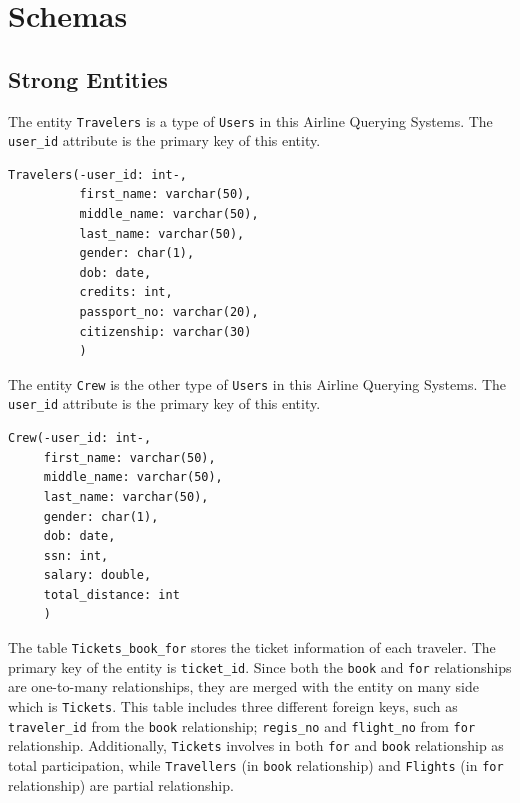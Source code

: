 \documentclass{article}
\begin{document}
	\section{Schemas}
	
	\subsection{Strong Entities}
	
	\noindent The entity \texttt{Travelers} is a type of \texttt{Users} in this Airline Querying Systems. The \texttt{user\_id} attribute is the primary key of this entity.
	\begin{lstlisting}[keepspaces=true]
Travelers(-user_id: int-,
          first_name: varchar(50),
          middle_name: varchar(50),
          last_name: varchar(50),
          gender: char(1),
          dob: date,
          credits: int,
          passport_no: varchar(20), 
          citizenship: varchar(30)
          )
	\end{lstlisting}
    
	\noindent The entity \texttt{Crew} is the other type of \texttt{Users} in this Airline Querying Systems. The \texttt{user\_id} attribute is the primary key of this entity.
	\begin{lstlisting}[keepspaces=true]
Crew(-user_id: int-,
     first_name: varchar(50),
     middle_name: varchar(50),
     last_name: varchar(50),
     gender: char(1),
     dob: date,
     ssn: int, 
     salary: double, 
     total_distance: int
     )
	\end{lstlisting}    

	\noindent The table \texttt{Tickets\_book\_for} stores the ticket information of each traveler. The primary key of the entity is  \texttt{ticket\_id}. Since both the \texttt{book} and \texttt{for} relationships are one-to-many relationships, they are merged with the entity on many side which is \texttt{Tickets}. This table includes three different foreign keys, such as \texttt{traveler\_id} from the \texttt{book} relationship; \texttt{regis\_no} and \texttt{flight\_no} from \texttt{for} relationship. Additionally, \texttt{Tickets} involves in both \texttt{for} and \texttt{book} relationship as total participation, while \texttt{Travellers} (in \texttt{book} relationship) and \texttt{Flights} (in \texttt{for} relationship) are partial relationship. 
\end{document}

